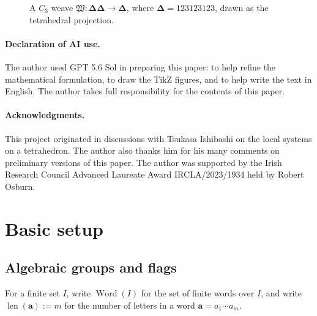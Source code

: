 \documentclass[10pt,a4paper]{article}
\theoremstyle{definition}
\theoremstyle{remark}
\newcommand{\fW}{\mathfrak W}
\newcommand{\len}{\operatorname{len}}
\newcommand{\Word}{\operatorname{Word}}
\begin{document}
\begin{figure}[htbp]
\centering
\resizebox{0.84\linewidth}{!}{}
\caption{A \(C_3\) weave
\(\fW : \boldsymbol\Delta\boldsymbol\Delta\to\boldsymbol\Delta\), where
\(\boldsymbol\Delta=123123123\), drawn as the tetrahedral projection.}
\label{fig:c3-tetrahedral-weave}
\end{figure}

\paragraph*{Declaration of AI use.}
The author used GPT 5.6 Sol in preparing this paper: to help refine the
mathematical formulation, to draw the TikZ figures, and to help write the text in
English.  The author takes full responsibility for the
contents of this paper.

\paragraph*{Acknowledgments.}
This project originated in discussions with Tsukasa Ishibashi on the local
systems on a tetrahedron.  The author also thanks him for his many comments on
preliminary versions of this paper.  The author was supported by the Irish
Research Council Advanced Laureate Award IRCLA/2023/1934 held by Robert
Osburn.

\section{Basic setup}
\label{sec:basic-setup}

\subsection{Algebraic groups and flags}
For a finite set \(I\), write \(\Word(I)\) for the set of finite words over
\(I\), and write \(\len(\mathbf a):=m\) for the number of letters in a word
\(\mathbf a=a_1\cdots a_m\).
\end{document}
